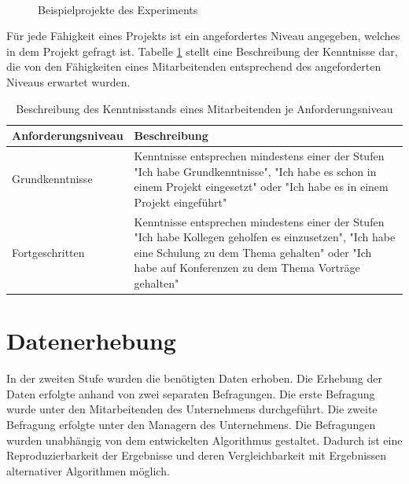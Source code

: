 \begin{figure}[H]
    \\
\caption[Beispielprojekte des Experiments]{Beispielprojekte des Experiments}
  \label{fig:methodik:abb2}
\end{figure}

Für jede Fähigkeit eines Projekts ist ein angefordertes Niveau angegeben, welches in dem Projekt gefragt ist.
Tabelle \ref{tab:methodik:tab1} stellt eine Beschreibung der Kenntnisse dar, die von den Fähigkeiten eines Mitarbeitenden entsprechend des angeforderten Niveaus erwartet wurden.

\begin{table}[htbp]
    \begin{center}
    \begin{tabular}{p{1.5in}|p{3.25in}}
    {\textbf{Anforderungsniveau}} & {\textbf{Beschreibung}}\\
    \hline
	Grundkenntnisse & Kenntnisse entsprechen mindestens einer der Stufen "Ich habe Grundkenntnisse", "Ich habe es schon in einem Projekt eingesetzt" oder "Ich habe es in einem Projekt eingeführt" \\
    \hline
    Fortgeschritten & Kenntnisse entsprechen mindestens einer der Stufen "Ich habe Kollegen geholfen es einzusetzen", "Ich habe eine Schulung zu dem Thema gehalten" oder "Ich habe auf Konferenzen zu dem Thema Vorträge gehalten" \\
    \end{tabular}
    \end{center}
    \caption[Beschreibung des Kenntnisstands eines Mitarbeitenden je Anforderungsniveau]{Beschreibung des Kenntnisstands eines Mitarbeitenden je Anforderungsniveau}
	\label{tab:methodik:tab1}
\end{table}

\section{Datenerhebung}
In der zweiten Stufe wurden die benötigten Daten erhoben.
Die Erhebung der Daten erfolgte anhand von zwei separaten Befragungen.
Die erste Befragung wurde unter den Mitarbeitenden des Unternehmens durchgeführt.
Die zweite Befragung erfolgte unter den Managern des Unternehmens.
Die Befragungen wurden unabhängig von dem entwickelten Algorithmus gestaltet.
Dadurch ist eine Reproduzierbarkeit der Ergebnisse und deren Vergleichbarkeit mit Ergebnissen alternativer Algorithmen möglich.

